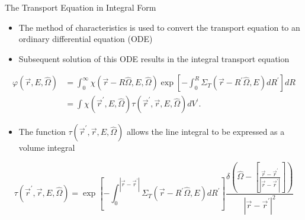 \documentclass{beamer}
\begin{document}
\begin{frame}{The Transport Equation in Integral Form}


  \begin{itemize}
    \item The method of characteristics is used to convert the transport 
      equation to an ordinary differential equation (ODE)
      \medskip
    \item Subsequent solution of this ODE results in the integral transport 
      equation
  \end{itemize}
  \begin{align}
    \varphi(\vec{r},E,\hat{\Omega}) & = 
    \int_0^{\infty} \chi(\vec{r} - R\hat{\Omega},E,\hat{\Omega})
    \exp{\left[-\int_0^R \Sigma_T(\vec{r}-R^{'}\hat{\Omega},E)dR^{'} \right]} 
    dR \nonumber \\
    & = \int \chi(\vec{r}^{'},E,\hat{\Omega}) 
    \tau(\vec{r}^{'},\vec{r},E,\hat{\Omega}) dV^{'}. \nonumber
  \end{align}
  
  \begin{itemize}
    \item The function $\tau(\vec{r}^{'},\vec{r},E,\hat{\Omega})$ allows
      the line integral to be expressed as a volume integral
  \end{itemize}
  \begin{equation*}
    \tau(\vec{r}^{'},\vec{r},E,\hat{\Omega})= 
    \exp{\left[-\int_0^{|\vec{r} - \vec{r}^{'}|} 
        \Sigma_T(\vec{r}-R^{'}\hat{\Omega},E)dR^{'} \right]} 
    \frac{\delta \left(\hat{\Omega} - \left[\frac{\vec{r} - \vec{r}^{'}}
        {|\vec{r} - \vec{r}^{'}|}\right]\right)}
         {|\vec{r} - \vec{r}^{'}|^2}
  \end{equation*}

\end{frame}
\end{document}
